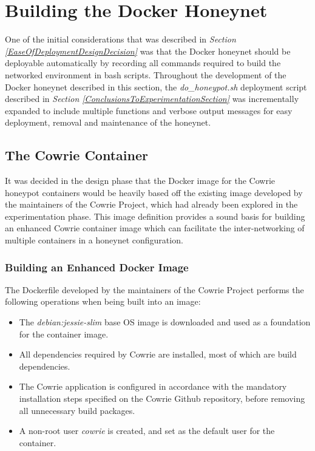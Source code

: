 

\section{Building the Docker Honeynet\label{BuildingTheDockerHoneynet}}
One of the initial considerations that was described in \textit{Section \ref{EaseOfDeploymentDesignDecision}} was that the Docker honeynet should be deployable automatically by recording all commands required to build the networked environment in bash scripts. Throughout the development of the Docker honeynet described in this section, the \textit{do\_honeypot.sh} deployment script described in \textit{Section \ref{ConclusionsToExperimentationSection}} was incrementally expanded to include multiple functions and verbose output messages for easy deployment, removal and maintenance of the honeynet.

%
%
\subsection{The Cowrie Container}
It was decided in the design phase that the Docker image for the Cowrie honeypot containers would be heavily based off the existing image developed by the maintainers of the Cowrie Project, which had already been explored in the experimentation phase. \cite{DockerCowrie} This image definition provides a sound basis for building an enhanced Cowrie container image which can facilitate the inter-networking of multiple containers in a honeynet configuration.


\subsubsection{Building an Enhanced Docker Image}
The Dockerfile developed by the maintainers of the Cowrie Project performs the following operations when being built into an image:

\begin{itemize}
\item The \textit{debian:jessie-slim} base OS image is downloaded and used as a foundation for the container image.
\item All dependencies required by Cowrie are installed, most of which are build dependencies.
\item The Cowrie application is configured in accordance with the mandatory installation steps specified on the Cowrie Github repository, \cite{CowrieInstallationInstructions} before removing all unnecessary build packages.
\item A non-root user \textit{cowrie} is created, and set as the default user for the container.
\end{itemize}


